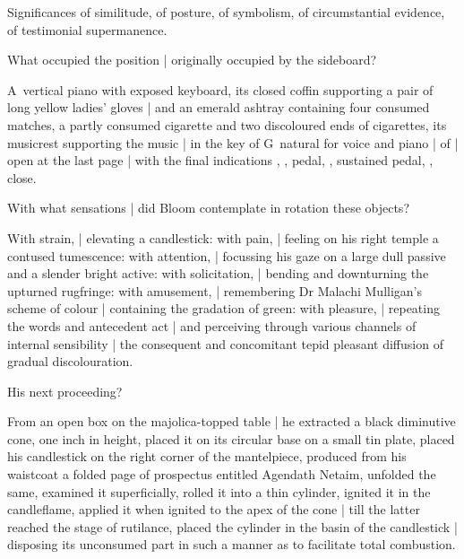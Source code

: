 \Household
Significances of similitude, of posture, of symbolism,
of circumstantial evidence, of testimonial supermanence.


What occupied the position |
originally occupied by the sideboard?

\Household
A~vertical piano
with exposed keyboard,
its closed coffin supporting a pair of long yellow ladies' gloves |
and an emerald ashtray containing four consumed matches,
a partly consumed cigarette and two discoloured ends of cigarettes,
its musicrest supporting the music |
in the key of G~natural for voice and piano |
of  |
open at the last page |
with the final indications
, , pedal,
, sustained pedal, ,
close.



With what sensations |
did Bloom contemplate in rotation these objects?

\Turns
With strain, |
elevating a candlestick:
with pain, |
feeling on his right temple a contused tumescence:
with attention, |
focussing his gaze
on a large dull passive and a slender bright active:
with solicitation, |
bending and downturning the upturned rugfringe:
with amusement, |
remembering Dr Malachi Mulligan's scheme of colour |
containing the gradation of green:
with pleasure, |
repeating the words and antecedent act |
and perceiving through various channels of internal sensibility |
the consequent and concomitant tepid pleasant diffusion of gradual discolouration.



His next proceeding?

\Science
From an open box on the majolica-topped table |
he extracted a black diminutive cone, one inch in height,
placed it on its circular base on a small tin plate,
placed his candlestick on the right corner of the mantelpiece,
produced from his waistcoat a folded page of prospectus
entitled Agendath Netaim,
unfolded the same,
examined it superficially,
rolled it into a thin cylinder,
ignited it in the candleflame,
applied it when ignited to the apex of the cone |
till the latter reached the stage of rutilance,
placed the cylinder in the basin of the candlestick |
disposing its unconsumed part
in such a manner as to facilitate total combustion.


